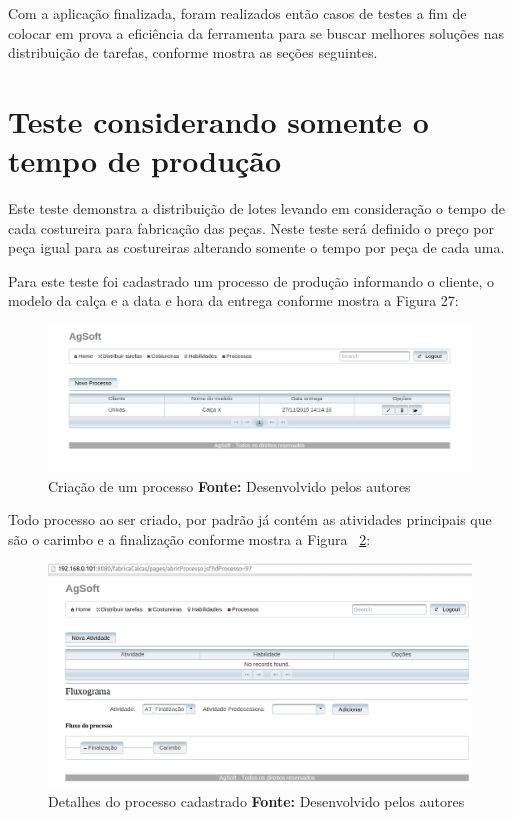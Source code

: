 \par Com a aplicação finalizada, foram realizados então casos de testes a fim de colocar em prova a eficiência da ferramenta para se 
buscar melhores soluções nas distribuição de tarefas, conforme mostra as seções
seguintes.


\section{Teste considerando somente o tempo de produção}

\par Este teste demonstra a distribuição de lotes levando em consideração o
tempo de cada costureira para fabricação das peças. Neste teste será definido o
preço por peça igual para as costureiras alterando somente o tempo por peça de
cada uma.

\par Para este teste foi cadastrado um processo de produção informando o
cliente, o modelo da calça e a data e hora da entrega conforme mostra a Figura 27:
\newpage

\begin{figure}[h!]
	\centerline{\includegraphics[scale=0.4]{./imagens/teste_processo.png}}
	\caption[Criação de um processo]
	{Criação de um processo \textbf{Fonte:} Desenvolvido pelos autores}
	\label{fig:exemplo1}
\end{figure}

\par Todo processo ao ser criado, por padrão já contém as atividades principais
que são o carimbo e a finalização conforme mostra a Figura
~\ref{fig:processo_cadastrado}:

\begin{figure}[h!]
	\centerline{\includegraphics[scale=0.4]{./imagens/tela_processo_teste1.png}}
	\caption[Detalhes do processo cadastrado]
	{Detalhes do processo cadastrado \textbf{Fonte:} Desenvolvido pelos autores}
	\label{fig:processo_cadastrado}
\end{figure}

